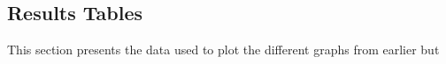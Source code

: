 
\subsection{Results Tables}

This section presents the data used to plot the different graphs from earlier but


%
%

